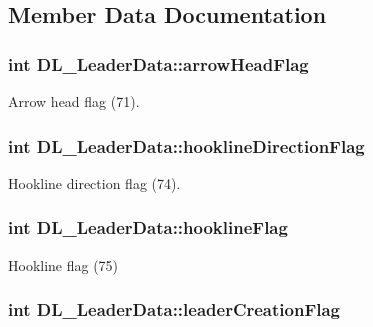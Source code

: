\subsection{Member Data Documentation}
\hypertarget{structDL__LeaderData_a5d4fb290c3a9aa9f97a621be2e532a06}{
\subsubsection[{arrow\-Head\-Flag}]{\setlength{\rightskip}{0pt plus 5cm}int D\-L\-\_\-\-Leader\-Data\-::arrow\-Head\-Flag}}\label{structDL__LeaderData_a5d4fb290c3a9aa9f97a621be2e532a06}
Arrow head flag (71). \hypertarget{structDL__LeaderData_aa7eb530ff33b3ee9c0b94a386240cd62}{
\subsubsection[{hookline\-Direction\-Flag}]{\setlength{\rightskip}{0pt plus 5cm}int D\-L\-\_\-\-Leader\-Data\-::hookline\-Direction\-Flag}}\label{structDL__LeaderData_aa7eb530ff33b3ee9c0b94a386240cd62}
Hookline direction flag (74). \hypertarget{structDL__LeaderData_ad5704cf436904a0c22843c35fbe1f65b}{
\subsubsection[{hookline\-Flag}]{\setlength{\rightskip}{0pt plus 5cm}int D\-L\-\_\-\-Leader\-Data\-::hookline\-Flag}}\label{structDL__LeaderData_ad5704cf436904a0c22843c35fbe1f65b}
Hookline flag (75) \hypertarget{structDL__LeaderData_afb482d86407e03f98cdae3e01c180ec3}{
\subsubsection[{leader\-Creation\-Flag}]{\setlength{\rightskip}{0pt plus 5cm}int D\-L\-\_\-\-Leader\-Data\-::leader\-Creation\-Flag}}\label{structDL__LeaderData_afb482d86407e03f98cdae3e01c180ec3}
